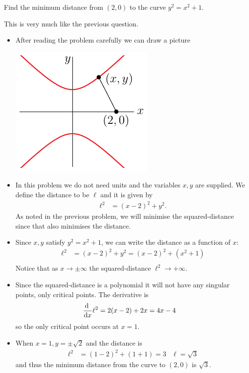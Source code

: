 \begin{eg}\label{APPglobalMaxMinDist}
 Find the minimum distance from $(2,0)$ to the curve $y^2=x^2+1$.

\soln This is very much like the previous question.
\begin{itemize}
 \item After reading the problem carefully we can draw a picture
\begin{efig}
\begin{center}
   \includegraphics{hyperbolaMaxMin}
\end{center}
\end{efig}
\item In this problem we do not need units and the variables $x,y$ are supplied. We define
the distance to be $\ell$ and it is given by
\begin{align*}
  \ell^2 &= (x-2)^2+y^2.
\end{align*}
As noted in the previous problem, we will minimise the squared-distance since that also
minimises the distance.
\item Since $x,y$ satisfy $y^2=x^2+1$, we can write the distance as a function of $x$:
\begin{align*}
  \ell^2 &= (x-2)^2 + y^2 = (x-2)^2 + (x^2+1)\\
\end{align*}
Notice that as $x \to \pm \infty$ the squared-distance $\ell^2 \to +\infty$.

\item Since the squared-distance is a polynomial it will not have any singular points,
only critical points. The derivative is
\begin{align*}
  \diff{}{x} \ell^2 &= 2(x-2) + 2x = 4x-4
\end{align*}
so the only critical point occurs at $x=1$.

\item When $x=1, y=\pm \sqrt{2}$ and the distance is
\begin{align*}
  \ell^2 &= (1-2)^2 + (1+1) = 3 & \ell=\sqrt{3}
\end{align*}
and thus the minimum distance from the curve to $(2,0)$ is $\sqrt{3}$.
\end{itemize}
\end{eg}

